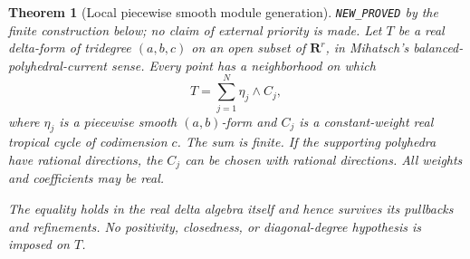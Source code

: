 \documentclass[11pt,a4paper]{article}
\numberwithin{equation}{section}
\newtheorem{theorem}{Theorem}[section]
\theoremstyle{definition}
\theoremstyle{remark}
\begin{document}
\begin{theorem}[Local piecewise smooth module generation]
\label{thm:r6-delta-module-generation}
\textnormal{\texttt{NEW\_PROVED}} by the finite construction below;
no claim of external priority is made.
Let $T$ be a real delta-form of tridegree $(a,b,c)$ on an open subset
of $\mathbf R^r$, in Mihatsch's balanced-polyhedral-current sense.
Every point has a neighborhood on which
\begin{equation}
                             T=\sum_{j=1}^N\eta_j\wedge C_j,
 \label{eq:r6-full-module-generation}
\end{equation}
where $\eta_j$ is a piecewise smooth $(a,b)$-form and $C_j$ is a
constant-weight real tropical cycle of codimension $c$.
The sum is finite.  If the supporting polyhedra have rational
directions, the $C_j$ can be chosen with rational directions.
All weights and coefficients may be real.

The equality holds in the real delta algebra itself and hence
survives its pullbacks and refinements.  No positivity, closedness,
or diagonal-degree hypothesis is imposed on $T$.
\end{theorem}
\end{document}
